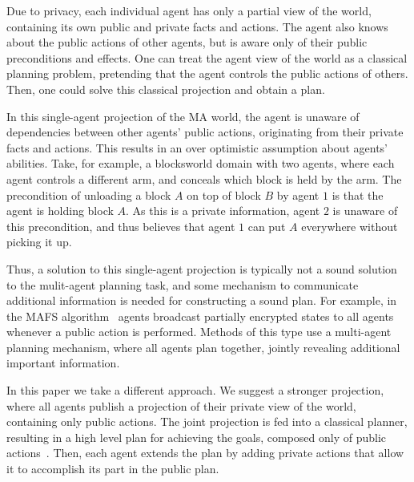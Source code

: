 \documentclass[letterpaper]{article}
\theoremstyle{definition}
\begin{document}
Due to privacy, each individual agent has only a partial view of the world, containing its own public and private facts and actions. The agent also knows about the public actions of other agents, but is aware only of their public preconditions and effects. One can treat the agent view of the world as a classical planning problem, pretending that the agent controls the public actions of others. Then, one could solve this classical projection and obtain a plan.

In this single-agent projection of the MA world, the agent is unaware of dependencies between other agents' public actions, originating from their private facts and actions. This results in an over optimistic assumption about agents' abilities. Take, for example, a blocksworld domain with two agents, where each agent controls a different arm, and conceals which block is held by the arm. The precondition of unloading a block $A$ on top of block $B$ 
by agent $1$ is that the agent is holding block $A$. As this is a private information, agent $2$ is unaware of this precondition, and thus believes that agent $1$ can put $A$ everywhere without picking it up.



Thus, a solution to this single-agent projection is typically not a sound solution to the mulit-agent planning task, and some mechanism to communicate additional information is needed for constructing a sound plan. For example, in the MAFS algorithm~\cite{nissim2014distributed} agents broadcast partially encrypted states to all agents whenever a public action is performed. Methods of this type use a multi-agent planning mechanism, where all agents plan together, jointly revealing additional important information.

In this paper we take a different approach. We suggest a stronger projection, where all agents publish a projection of their private view of the world, containing only public actions. The joint projection is fed into a classical planner, resulting in a high level plan for achieving the goals, composed only of public actions~\cite{brafman2008one,maliah2014privacyPreserving}. Then, each agent extends the plan by adding private actions that allow it to accomplish its part in the public plan. 
\end{document}
